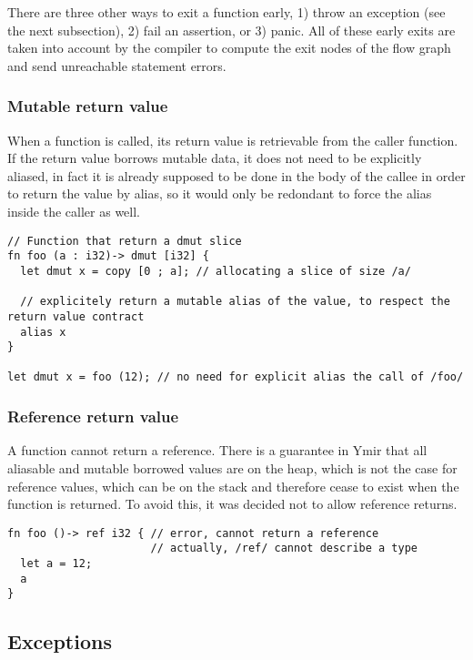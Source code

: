There are three other ways to exit a function early, 1) throw an exception (see
the next subsection), 2) fail an assertion, or 3) panic. All of these early
exits are taken into account by the compiler to compute the exit nodes of the
flow graph and send unreachable statement errors.

\subsubsection{Mutable return value}

When a function is called, its return value is retrievable from the caller
function. If the return value borrows mutable data, it does not need to be
explicitly aliased, in fact it is already supposed to be done in the body of the
callee in order to return the value by alias, so it would only be redondant to
force the alias inside the caller as well.

\begin{lstlisting}[style=coloredverbatim]
// Function that return a dmut slice
fn foo (a : i32)-> dmut [i32] {
  let dmut x = copy [0 ; a]; // allocating a slice of size /a/

  // explicitely return a mutable alias of the value, to respect the return value contract
  alias x
}

let dmut x = foo (12); // no need for explicit alias the call of /foo/
\end{lstlisting}

\subsubsection {Reference return value}

A function cannot return a reference. There is a guarantee in Ymir that all
aliasable and mutable borrowed values are on the heap, which is not the case for
reference values, which can be on the stack and therefore cease to exist when
the function is returned. To avoid this, it was decided not to allow reference
returns.

\begin{lstlisting}[style=coloredverbatim]
fn foo ()-> ref i32 { // error, cannot return a reference
                      // actually, /ref/ cannot describe a type
  let a = 12;
  a
}
\end{lstlisting}

\subsection {Exceptions}

